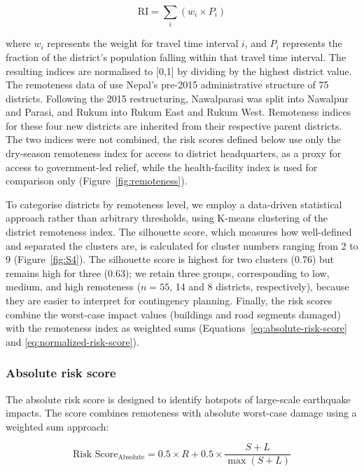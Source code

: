 \documentclass[preprint,12pt,authoryear]{elsarticle}
\begin{document}
\begin{equation}
\label{eq:remoteness-index}
\text{RI} = \sum_{i} \left( w_{i} \times P_{i} \right)
\end{equation}

where $w_{i}$ represents the weight for travel time interval $i$, and $P_{i}$ represents the fraction of the district's population falling within that travel time interval. The resulting indices are normalised to [0,1] by dividing by the highest district value. The remoteness data of \cite{banick2019} use Nepal's pre-2015 administrative structure of 75 districts. Following the 2015 restructuring, Nawalparasi was split into Nawalpur and Parasi, and Rukum into Rukum East and Rukum West. Remoteness indices for these four new districts are inherited from their respective parent districts. The two indices were not combined, the risk scores defined below use only the dry-season remoteness index for access to district headquarters, as a proxy for access to government-led relief, while the health-facility index is used for comparison only (Figure~\ref{fig:remoteness}).

To categorise districts by remoteness level, we employ a data-driven statistical approach rather than arbitrary thresholds, using K-means clustering of the district remoteness index. The silhouette score, which measures how well-defined and separated the clusters are, is calculated for cluster numbers ranging from 2 to 9 (Figure~\ref{fig:S4}). The silhouette score is highest for two clusters (0.76) but remains high for three (0.63); we retain three groups, corresponding to low, medium, and high remoteness ($n = 55$, 14 and 8 districts, respectively), because they are easier to interpret for contingency planning. Finally, the risk scores combine the worst-case impact values (buildings and road segments damaged) with the remoteness index as weighted sums (Equations~\ref{eq:absolute-risk-score} and \ref{eq:normalized-risk-score}).

\subsubsection{Absolute risk score}

The absolute risk score is designed to identify hotspots of large-scale earthquake impacts. The score combines remoteness with absolute worst-case damage using a weighted sum approach:

\begin{equation}
\label{eq:absolute-risk-score}
\text{Risk Score}_{\text{Absolute}} = 0.5 \times R + 0.5 \times \frac{S + L}{\max(S + L)}
\end{equation}
\end{document}
